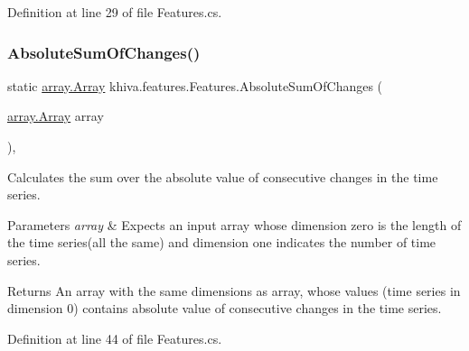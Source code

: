 Definition at line 29 of file Features.\+cs.

\mbox{\label{classkhiva_1_1features_1_1_features_a0084451068ce2f104b7075350aad9eba}} 
\subsubsection{\texorpdfstring{Absolute\+Sum\+Of\+Changes()}{AbsoluteSumOfChanges()}}
{\footnotesize\ttfamily static \mbox{\hyperlink{classkhiva_1_1array_1_1_array}{array.\+Array}} khiva.\+features.\+Features.\+Absolute\+Sum\+Of\+Changes (\begin{DoxyParamCaption}\item[{\mbox{\hyperlink{classkhiva_1_1array_1_1_array}{array.\+Array}}}]{array }\end{DoxyParamCaption})\hspace{0.3cm}{\ttfamily [inline]}, {\ttfamily [static]}}



Calculates the sum over the absolute value of consecutive changes in the time series. 


\begin{DoxyParams}{Parameters}
{\em array} & Expects an input array whose dimension zero is the length of the time series(all the same) and dimension one indicates the number of time series.\\
\hline
\end{DoxyParams}
\begin{DoxyReturn}{Returns}
An array with the same dimensions as array, whose values (time series in dimension 0) contains absolute value of consecutive changes in the time series.
\end{DoxyReturn}


Definition at line 44 of file Features.\+cs.

\mbox{\label{classkhiva_1_1features_1_1_features_a5caed649747363b05e0311d7d6d1e68d}} 
